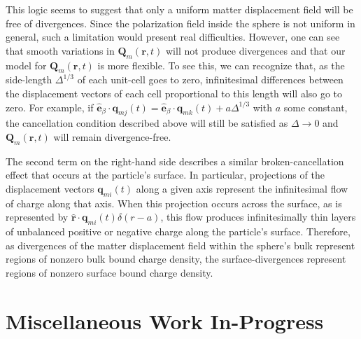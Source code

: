 \documentclass{article}
\begin{document}
This logic seems to suggest that only a uniform matter displacement field will be free of divergences. Since the polarization field inside the sphere is not uniform in general, such a limitation would present real difficulties. However, one can see that smooth variations in $\mathbf{Q}_m(\mathbf{r},t)$ will not produce divergences and that our model for $\mathbf{Q}_m(\mathbf{r},t)$ is more flexible. To see this, we can recognize that, as the side-length $\Delta^{1/3}$ of each unit-cell goes to zero, infinitesimal differences between the displacement vectors of each cell proportional to this length will also go to zero. For example, if $\hat{\mathbf{e}}_\beta\cdot\mathbf{q}_{mj}(t) = \hat{\mathbf{e}}_\beta\cdot\mathbf{q}_{mk}(t) + a\Delta^{1/3}$ with $a$ some constant, the cancellation condition described above will still be satisfied as $\Delta\to0$ and $\mathbf{Q}_m(\mathbf{r},t)$ will remain divergence-free.

The second term on the right-hand side describes a similar broken-cancellation effect that occurs at the particle's surface. In particular, projections of the displacement vectors $\mathbf{q}_{mi}(t)$ along a given axis represent the infinitesimal flow of charge along that axis. When this projection occurs across the surface, as is represented by $\hat{\mathbf{r}}\cdot\mathbf{q}_{mi}(t)\delta(r - a)$, this flow produces infinitesimally thin layers of unbalanced positive or negative charge along the particle's surface. Therefore, as divergences of the matter displacement field within the sphere's bulk represent regions of nonzero bulk bound charge density, the surface-divergences represent regions of nonzero surface bound charge density.










\section{Miscellaneous Work In-Progress}
\end{document}
